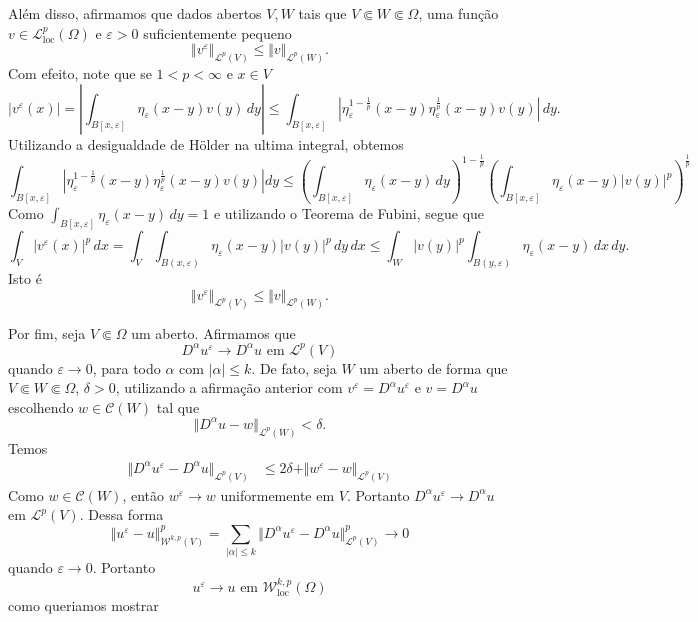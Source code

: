 \documentclass[a4paper, 11pt]{book}
\theoremstyle{definition}
\newcommand{\cC}{\mathcal{C}}
\newcommand{\cL}{\mathcal{L}}
\newcommand{\cW}{\mathcal{W}}
\newcommand{\loc}{\mathrm{loc}}
\begin{document}
\begin{prf}
    Além disso, afirmamos que dados abertos $V, W$ tais que $V \Subset W \Subset \Omega$, uma função $v \in \cL^p_\loc(\Omega)$ e $\varepsilon > 0$ suficientemente pequeno
    \[
        \Vert v^\varepsilon \Vert_{\cL^p(V)} \leqslant \Vert v \Vert_{\cL^p(W)}.
    \]
    Com efeito, note que se $1 < p < \infty$ e $x \in V$
    \[
        |v^\varepsilon(x)| = \left| \int_{B[x,\varepsilon]} \eta_\varepsilon(x-y) v (y) \,dy \right| \leqslant \int_{B[x,\varepsilon]} \left| \eta_\varepsilon^{1-\frac{1}{p}}(x-y) \eta_\varepsilon^{\frac{1}{p}}(x-y) v(y) \right| \,dy.
    \]
    Utilizando a desigualdade de Hölder na ultima integral, obtemos
    \[
        \int_{B[x,\varepsilon]} \left| \eta_\varepsilon^{1-\frac{1}{p}}(x-y) \eta_\varepsilon^{\frac{1}{p}}(x-y) v(y) \right|dy \leqslant \left( \int_{B[x,\varepsilon]} \eta_\varepsilon (x-y) \,dy\right)^{\!1-\frac{1}{p}} \left( \int_{B[x,\varepsilon]} \eta_\varepsilon(x-y) |v(y)|^p \right)^{\frac{1}{p}}
    \]
    Como $\displaystyle\int_{B[x,\varepsilon]} \eta_\varepsilon(x-y) \,dy = 1$ e utilizando o Teorema de Fubini, segue que
    \[
        \int_V |v^\varepsilon(x)|^p \,dx = \int_V \int_{B(x,\varepsilon)} \eta_\varepsilon(x-y) |v(y)|^p \,dy \,dx \leqslant \int_W |v(y)|^p \int_{B(y,\varepsilon)} \eta_\varepsilon(x-y) \,dx \,dy.
    \]
    Isto é
    \[
        \Vert v^\varepsilon \Vert_{\cL^p(V)} \leqslant \Vert v \Vert_{\cL^p(W)}.
    \]

    Por fim, seja $V \Subset \Omega$ um aberto. Afirmamos que
    \[
        D ^\alpha u^\varepsilon \to D^\alpha u \text{ em } \cL^p(V)
    \]
    quando $\varepsilon \to 0$, para todo $\alpha$ com $|\alpha| \leqslant k$.
    De fato, seja $W$ um aberto de forma que $V \Subset W \Subset \Omega$, $\delta > 0$, utilizando a afirmação anterior com $v ^\varepsilon = D^\alpha u^\varepsilon$ e $v = D^\alpha u$ escolhendo $w \in \cC(W)$ tal que
    \[
        \Vert D^\alpha u - w \Vert_{\cL^p(W)} < \delta.
    \]
    Temos
    \[
        \begin{aligned}
            \Vert D^\alpha u^\varepsilon - D^\alpha u \Vert_{\cL^p(V)} 
            &\leqslant 2\delta + \Vert w^\varepsilon - w \Vert_{\cL^p(V)}
        \end{aligned}
    \]
    Como $w \in \cC(W)$, então $w^\varepsilon \to w$ uniformemente em $V$. 
    Portanto $D^\alpha u^\varepsilon \to D^\alpha u$ em $\cL^p(V)$.
    Dessa forma
    \[
        \Vert u^\varepsilon - u \Vert^p_{\cW^{k,p}(V)} = \sum_{|\alpha| \leqslant k} \Vert D^\alpha u^\varepsilon - D^\alpha u \Vert^p_{\cL^p(V)} \to 0 
    \]
    quando $\varepsilon \to 0$. Portanto
    \[
        u^\varepsilon \to u \text{ em } \cW^{k,p}_\loc(\Omega)
    \]
    como queriamos mostrar
\end{prf}
\end{document}
